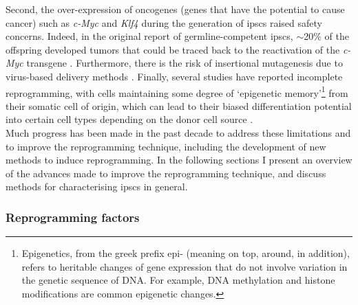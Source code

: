 Second, the over-expression of oncogenes (genes that have the potential to cause cancer) such as \textit{c-Myc} and \textit{Klf4} during the generation of \glspl{ipsc} raised safety concerns.
Indeed, in the original report of germline-competent \glspl{ipsc}, $\sim$20\% of the offspring developed tumors that could be traced back to the reactivation of the \textit{c-Myc} transgene \cite{okita2007generation}. 
Furthermore, there is the risk of insertional mutagenesis due to virus-based delivery methods \cite{takahashi2006induction, takahashi2007induction, yu2007induced}. 
Finally, several studies have reported incomplete reprogramming, with cells maintaining some degree of `epigenetic memory'\footnote{Epigenetics, from the greek prefix epi- (meaning on top, around, in addition), refers to heritable changes of gene expression that do not involve variation in the genetic sequence of DNA.
For example, DNA methylation and histone modifications are common epigenetic changes.} from their somatic cell of origin, which can lead to their biased differentiation potential into certain cell types depending on the donor cell source \cite{kim2010epigenetic, polo2010cell}.\\

Much progress has been made in the past decade to address these limitations and to improve the reprogramming technique, including the development of new methods to induce reprogramming. 
In the following sections I present an overview of the advances made to improve the reprogramming technique, and discuss
methods for characterising \glspl{ipsc} in general. 

\subsubsection{Reprogramming factors}

